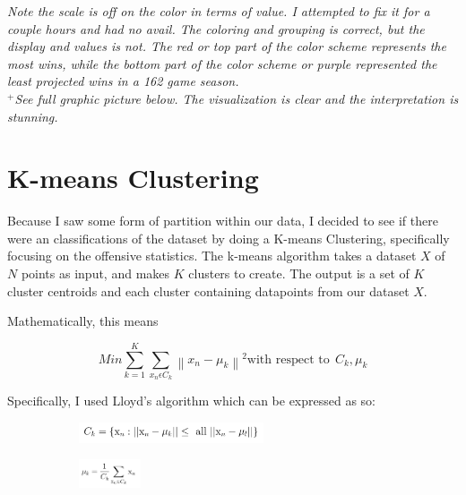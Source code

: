 \documentclass[12pt]{article}
\numberwithin{equation}{subsection}
\begin{document}
\noindent\textit{Note the scale is off on the color in terms of value. I attempted to fix it for a couple hours and had no avail. The coloring and grouping is correct, but the display and values is not. The red or top part of the color scheme represents the most wins, while the bottom part of the color scheme or purple represented the least projected wins in a 162 game season.}\\

\noindent\textit{$^+$See full graphic picture below. The visualization is clear and the interpretation is stunning.}


\section{K-means Clustering}
Because I saw some form of partition within our data, I decided to see if there were an classifications of the dataset by doing a K-means Clustering, specifically focusing on the offensive statistics. The k-means algorithm takes a dataset $X$ of $N$ points as input, and makes $K$ clusters to create. The output is a set of $K$ cluster centroids and each cluster containing datapoints from our dataset $X$.

Mathematically, this means 

\begin{equation}
	Min \sum_{k=1}^{K}\sum_{x_n\epsilon C_k}^{}\left \| x_n-\mu _k \right \|^2 \text{with respect to} \ \ C_k,\mu _k
\end{equation}

Specifically, I used Lloyd's algorithm \cite{kmeans}\cite{kmeans2} which can be expressed as so:

\begin{figure}[H]
	\begin{subfigure}[b]{\linewidth}
		\centering
		\includegraphics[width=0.6\textwidth]{lloyd1}
        \end{subfigure}
    \begin{subfigure}[b]{\linewidth}
    	\centering
		\includegraphics[width=0.20\textwidth]{lloyd2}
    \end{subfigure}
\end{figure}
\end{document}
